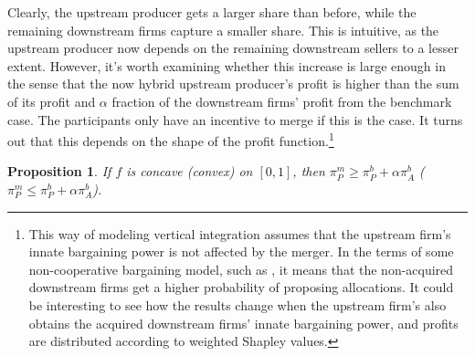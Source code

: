 \documentclass[a4paper]{article}
\newtheorem{proposition}{Proposition}
\begin{document}
Clearly, the upstream producer gets a larger share than before, while the remaining downstream firms capture a smaller share.
This is intuitive, as the upstream producer now depends on the remaining downstream sellers to a lesser extent.
However, it's worth examining whether this increase is large enough in the sense that the now hybrid upstream producer's profit is higher than the sum of its profit and $\alpha$ fraction of the downstream firms' profit from the benchmark case.
The participants only have an incentive to merge if this is the case.
It turns out that this depends on the shape of the profit function.\footnote{
    This way of modeling vertical integration assumes that the upstream firm's innate bargaining power is not affected by the merger.
    In the terms of some non-cooperative bargaining model, such as \textcite{hart1996bargaining}, it means that the non-acquired downstream firms get a higher probability of proposing allocations.
    It could be interesting to see how the results change when the upstream firm's also obtains the acquired downstream firms' innate bargaining power, and profits are distributed according to weighted Shapley values.
}

\begin{proposition}
    \label{prop:vertical_integration}
    If $f$ is concave (convex) on $[0, 1]$, then $\pi_P^m \geq \pi_P^b + \alpha \pi_A^b$ ($\pi_P^m \leq \pi_P^b + \alpha \pi_A^b$). 
\end{proposition}
\end{document}
